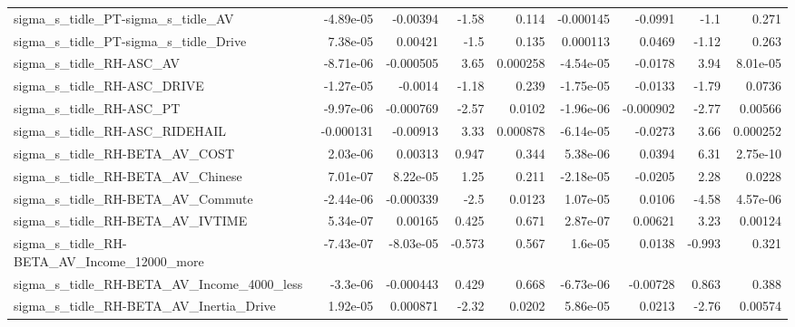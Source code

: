 \begin{tabular}{lrrrrrrrr}
sigma\_s\_tidle\_PT-sigma\_s\_tidle\_AV                  &   -4.89e-05 &     -0.00394 &    -1.58 &    0.114 &  -0.000145 &     -0.0991 &         -1.1 &         0.271 \\
sigma\_s\_tidle\_PT-sigma\_s\_tidle\_Drive               &    7.38e-05 &      0.00421 &     -1.5 &    0.135 &   0.000113 &      0.0469 &        -1.12 &         0.263 \\
sigma\_s\_tidle\_RH-ASC\_AV                            &   -8.71e-06 &    -0.000505 &     3.65 & 0.000258 &  -4.54e-05 &     -0.0178 &         3.94 &      8.01e-05 \\
sigma\_s\_tidle\_RH-ASC\_DRIVE                         &   -1.27e-05 &      -0.0014 &    -1.18 &    0.239 &  -1.75e-05 &     -0.0133 &        -1.79 &        0.0736 \\
sigma\_s\_tidle\_RH-ASC\_PT                            &   -9.97e-06 &    -0.000769 &    -2.57 &   0.0102 &  -1.96e-06 &   -0.000902 &        -2.77 &       0.00566 \\
sigma\_s\_tidle\_RH-ASC\_RIDEHAIL                      &   -0.000131 &     -0.00913 &     3.33 & 0.000878 &  -6.14e-05 &     -0.0273 &         3.66 &      0.000252 \\
sigma\_s\_tidle\_RH-BETA\_AV\_COST                      &    2.03e-06 &      0.00313 &    0.947 &    0.344 &   5.38e-06 &      0.0394 &         6.31 &      2.75e-10 \\
sigma\_s\_tidle\_RH-BETA\_AV\_Chinese                   &    7.01e-07 &     8.22e-05 &     1.25 &    0.211 &  -2.18e-05 &     -0.0205 &         2.28 &        0.0228 \\
sigma\_s\_tidle\_RH-BETA\_AV\_Commute                   &   -2.44e-06 &    -0.000339 &     -2.5 &   0.0123 &   1.07e-05 &      0.0106 &        -4.58 &      4.57e-06 \\
sigma\_s\_tidle\_RH-BETA\_AV\_IVTIME                    &    5.34e-07 &      0.00165 &    0.425 &    0.671 &   2.87e-07 &     0.00621 &         3.23 &       0.00124 \\
sigma\_s\_tidle\_RH-BETA\_AV\_Income\_12000\_more         &   -7.43e-07 &    -8.03e-05 &   -0.573 &    0.567 &    1.6e-05 &      0.0138 &       -0.993 &         0.321 \\
sigma\_s\_tidle\_RH-BETA\_AV\_Income\_4000\_less          &    -3.3e-06 &    -0.000443 &    0.429 &    0.668 &  -6.73e-06 &    -0.00728 &        0.863 &         0.388 \\
sigma\_s\_tidle\_RH-BETA\_AV\_Inertia\_Drive             &    1.92e-05 &     0.000871 &    -2.32 &   0.0202 &   5.86e-05 &      0.0213 &        -2.76 &       0.00574 \\

\end{tabular}
